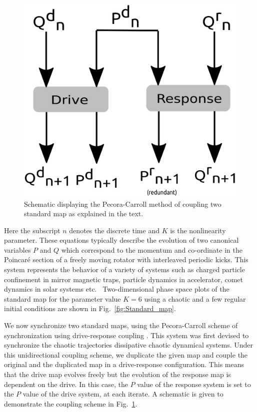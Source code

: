 \documentclass[reprint,amsmath,amssymb,aps,pre]{revtex4-1}
\begin{document}
\begin{figure}[t]
	\includegraphics[scale=.3]{pecora_caroll_schematic.eps}
	\caption{\label{fig:schematic} \footnotesize Schematic displaying the Pecora-Carroll method of coupling two standard map as explained in the text.}
\end{figure}
\noindent Here the subscript $n$ denotes the discrete time and $K$ is the 
nonlinearity parameter. These equations typically describe the evolution of 
two canonical variables $P$ and $Q$ which correspond to the momentum and 
co-ordinate in the Poincar\'{e} section of a freely moving rotator with 
interleaved periodic kicks. This system represents the behavior of a variety 
of systems such as charged particle confinement in  mirror magnetic traps, 
particle dynamics in accelerator, comet dynamics in solar systems 
etc.~\cite{Chirikov1960,Izraelev1980,Chirikov1989,Chirikov2008}
Two-dimensional  phase space plots  of the standard map for the parameter 
value $K = 6$ using a chaotic and a few regular initial conditions  are shown in Fig.~\ref{fig:Standard_map}.


We now synchronize two standard maps, using the Pecora-Carroll scheme of synchronization using drive-response coupling \cite{Pecora1990,Pecora2015}. 
This system was first devised to synchronize the chaotic trajectories dissipative chaotic dynamical systems. Under this unidirectional coupling scheme, we duplicate the given map and couple the original and the duplicated map in a drive-response configuration. This means that the drive map evolves freely but the evolution of the response map is dependent on the drive. In this case, the $P$ value of the response system is set to the $P$ value of the drive system, at each iterate.  A schematic is given to demonstrate the coupling scheme in Fig.~\ref{fig:schematic}.
\end{document}

